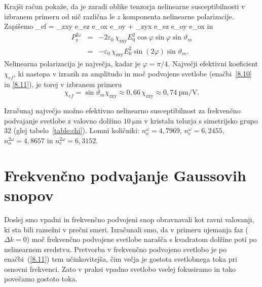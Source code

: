 \eeq
Krajši račun pokaže, da je zaradi oblike tenzorja nelinearne susceptibilnosti v izbranem 
primeru od nič različna le $z$ komponenta nelinearne polarizacije. Zapišemo
\beq
\chi_{ef} = \chi_{\textrm{zxy}} e_{ez} e_{ox} e_{oy} + \chi_{\textrm{zyx}} e_{ez} e_{oy} e_{ox}
\eeq
in
\begin{eqnarray}
P_{\textrm{z}}^{2\omega}&=&- 2\varepsilon_0\, \chi_{\textrm{zxy}}E_{0}^2\cos\varphi\sin\varphi
\sin\vartheta_m \nonumber \\
&=& - \varepsilon_0\, \chi_{\textrm{zxy}}E_{0}^2\sin(2\varphi) \sin\vartheta_m.
\label{8.151}
\end{eqnarray}
Nelinearna polarizacija je največja, kadar je $\varphi=\pi/4$.
Največji efektivni koeficient $\chi_{ef}$, ki nastopa v izrazih za amplitudo in 
moč podvojene svetlobe (enačbi~\ref{8.10} in \ref{8.11}), je torej v izbranem primeru 
\begin{equation}
\chi_{ef}= 
\sin\vartheta_m \chi_{\textrm{zxy}} \approx 0,66\, \chi_{\textrm{zxy}} \approx 0,74~\mathrm{pm/V}.
\label{8.16}
\end{equation}

\begin{definition}
Izračunaj največjo možno efektivno nelinearno susceptibilnost za frekvenčno podvajanje svetlobe z valovno
dolžino $10~\si{\micro\metre}$ v kristalu telurja s simetrijsko grupo 32 (glej tabelo~\ref{table:chi}). 
Lomni količniki: $n_o^{\omega} = 4,7969$, 
$n_e^{\omega} = 6,2455$, $n_o^{2\omega} = 4,8657$ in $n_e^{2\omega} = 6,3152$.
\end{definition}

\section{Frekvenčno podvajanje Gaussovih snopov}
Doslej smo vpadni in frekvenčno podvojeni snop obravnavali kot ravni valovanji,
ki sta bili razsežni v prečni smeri. Izračunali smo, da v primeru 
ujemanja faz ($\Delta k=0$)
moč frekvenčno podvojene svetlobe narašča s kvadratom dolžine poti po nelinearnem
sredstvu. Pretvorba v frekvenčno podvojeno svetlobo je po enačbi~(\ref{8.11}) tem
učinkovitejša, čim večja je gostota svetlobnega toka pri osnovni frekvenci.
Zato v praksi vpadno svetlobo vselej fokusiramo in tako povečamo gostoto toka.  

